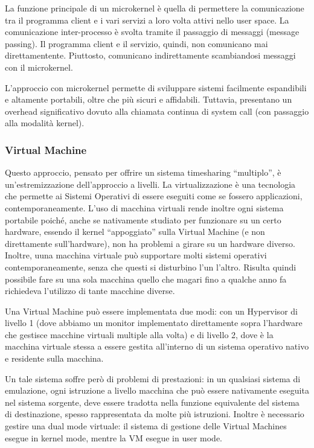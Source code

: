 \documentclass[a4]{article}
\begin{document}
La funzione principale di un microkernel è quella di permettere la comunicazione tra il programma client e i vari servizi a loro volta attivi nello user space. La comunicazione inter-processo è svolta tramite il passaggio di messaggi (message passing). Il programma client e il servizio, quindi, non comunicano mai direttamentente. Piuttosto, comunicano indirettamente scambiandosi messaggi con il microkernel.

L'approccio con microkernel permette di sviluppare sistemi facilmente espandibili e altamente portabili, oltre che più sicuri e affidabili. Tuttavia, presentano un overhead significativo dovuto alla chiamata continua di system call (con passaggio alla modalità kernel).

\subsubsection{Virtual Machine}
Questo approccio, pensato per offrire un sistema timesharing ``multiplo'', è un'estremizzazione dell'approccio a livelli. La virtualizzazione è una tecnologia che permette ai Sistemi Operativi di essere eseguiti come se fossero applicazioni, contemporaneamente. L'uso di macchina virtuali rende inoltre ogni sistema portabile poiché, anche se nativamente studiato per funzionare su un certo hardware, essendo il kernel ``appoggiato'' sulla Virtual Machine (e non direttamente sull'hardware), non ha problemi a girare su un hardware diverso. Inoltre, uuna macchina virtuale può supportare molti sistemi operativi contemporaneamente, senza che questi si disturbino l'un l'altro. Risulta quindi possibile fare su una sola macchina quello che magari fino a qualche anno fa richiedeva l'utilizzo di tante macchine diverse.

Una Virtual Machine può essere implementata due modi: con un Hypervisor di livello 1 (dove abbiamo un monitor implementato direttamente sopra l'hardware che gestisce macchine virtuali multiple alla volta) e di livello 2, dove è la macchina virtuale stessa a essere gestita all'interno di un sistema operativo nativo e residente sulla macchina.

Un tale sistema soffre però di problemi di prestazioni: in un qualsiasi sistema di emulazione, ogni istruzione a livello macchina che può essere nativamente eseguita nel sistema sorgente, deve essere tradotta nella funzione equivalente del sistema di destinazione, spesso rappresentata da molte più istruzioni. Inoltre è necessario gestire una dual mode virtuale: il sistema di gestione delle Virtual Machines esegue in kernel mode, mentre la VM esegue in user mode.
\end{document}
